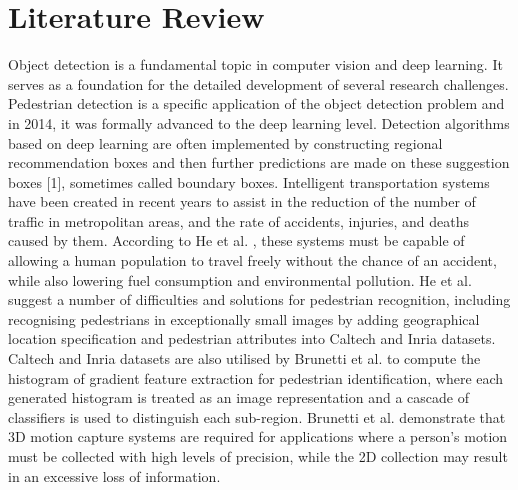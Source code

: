 \documentclass[11pt,a4paper]{article}
\begin{document}
\newpage

\section*{Literature Review}
Object detection is a fundamental topic in computer vision and deep learning. It serves as a foundation for the detailed development of several research challenges. Pedestrian detection is a specific application of the object detection problem and in 2014, it was formally advanced to the deep learning level. Detection algorithms based on deep learning are often implemented by constructing regional recommendation boxes and then further predictions are made on these suggestion boxes [1], sometimes called boundary boxes. 
\newline\newline
Intelligent transportation systems have been created in recent years to assist in the reduction of the number of traffic in metropolitan areas, and the rate of accidents, injuries, and deaths caused by them. According to He et al. \cite{he2021applications}, these systems must be capable of allowing a human population to travel freely without the chance of an accident, while also lowering fuel consumption and environmental pollution. He et al. \cite{he2021applications} suggest a number of difficulties and solutions for pedestrian recognition, including recognising pedestrians in exceptionally small images by adding geographical location specification and pedestrian attributes into Caltech and Inria datasets.
\newline\newline
Caltech and Inria datasets are also utilised by Brunetti et al. \cite{brunetti2018computer} to compute the histogram of gradient feature extraction for pedestrian identification, where each generated histogram is treated as an image representation and a cascade of classifiers is used to distinguish each sub-region. Brunetti et al. \cite{brunetti2018computer} demonstrate that 3D motion capture systems are required for applications where a person's motion must be collected with high levels of precision, while the 2D collection may result in an excessive loss of information.
\newline\newline
\end{document}
